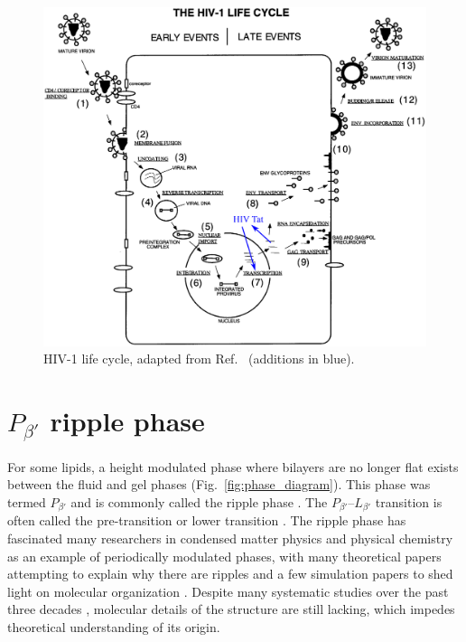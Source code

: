 \begin{figure}[htbp]
  \centering
  \includegraphics[width=\textwidth]{figures/HIV_lifecycle}
  \caption{HIV-1 life cycle, adapted from Ref.~\cite{Freed98}
  (additions in blue).}
  \label{fig:HIV_lifecycle}
\end{figure}

\section{$P_{\beta'}$ ripple phase}\label{sec:ripple_phase}
For some lipids, a height modulated phase where
bilayers are no longer flat exists between the fluid and gel phases
(Fig.~\ref{fig:phase_diagram}). 
This phase was termed $P_{\beta'}$ 
and is commonly called the ripple phase \cite{ref:Tardieu73}. 
The $P_{\beta'}$--$L_{\beta'}$ transition is often
called the pre-transition \cite{ref:Wack89} or lower transition \cite{Nagle00}.
The ripple phase has fascinated many researchers in condensed matter physics
and physical chemistry as an example of periodically modulated phases,
with many theoretical papers attempting to explain why there are 
ripples 
\cite{ref:Doniach79,ref:Marder84,ref:Hawton86,ref:Carlson87,ref:Goldstein88,ref:McCullough90,ref:Honda91,ref:Lubensky93,ref:Sengupta01,ref:Kamal11}
and a few simulation papers to shed light on molecular organization 
\cite{ref:deVries05,ref:Lenz07,ref:Scott84,ref:Debnath09}.
Despite many systematic studies over the past three decades
\cite{ref:Tardieu73,ref:Janiak76,ref:Copeland80,ref:Ruppel83,ref:Zasadzinski87,ref:Wack89,ref:Sun96,ref:Katsaras00,ref:Sengupta03}, 
molecular details of the structure are still lacking, which impedes
theoretical understanding of its origin.

